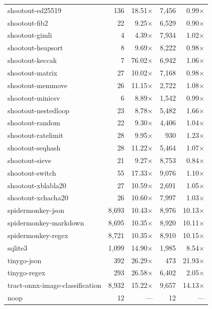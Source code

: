 \begin{longtable}{l r r r r}
shootout-ed25519 & 136 & 18.51$\times$ & 7{,}456 & 0.99$\times$ \\
shootout-fib2 & 22 & 9.25$\times$ & 6{,}529 & 0.90$\times$ \\
shootout-gimli & 4 & 4.39$\times$ & 7{,}934 & 1.02$\times$ \\
shootout-heapsort & 8 & 9.69$\times$ & 8{,}222 & 0.98$\times$ \\
shootout-keccak & 7 & 76.02$\times$ & 6{,}942 & 1.06$\times$ \\
shootout-matrix & 27 & 10.02$\times$ & 7{,}168 & 0.98$\times$ \\
shootout-memmove & 26 & 11.15$\times$ & 2{,}722 & 1.08$\times$ \\
shootout-minicsv & 6 & 8.89$\times$ & 1{,}542 & 0.99$\times$ \\
shootout-nestedloop & 23 & 8.78$\times$ & 5{,}482 & 1.66$\times$ \\
shootout-random & 22 & 9.30$\times$ & 4{,}406 & 1.04$\times$ \\
shootout-ratelimit & 28 & 9.95$\times$ & 930 & 1.23$\times$ \\
shootout-seqhash & 28 & 11.22$\times$ & 5{,}464 & 1.07$\times$ \\
shootout-sieve & 21 & 9.27$\times$ & 8{,}753 & 0.84$\times$ \\
shootout-switch & 55 & 17.33$\times$ & 9{,}076 & 1.10$\times$ \\
shootout-xblabla20 & 27 & 10.59$\times$ & 2{,}691 & 1.05$\times$ \\
shootout-xchacha20 & 26 & 10.60$\times$ & 7{,}997 & 1.03$\times$ \\
spidermonkey-json & 8{,}693 & 10.43$\times$ & 8{,}976 & 10.13$\times$ \\
spidermonkey-markdown & 8{,}695 & 10.35$\times$ & 8{,}920 & 10.11$\times$ \\
spidermonkey-regex & 8{,}721 & 10.35$\times$ & 8{,}910 & 10.15$\times$ \\
sqlite3 & 1{,}099 & 14.90$\times$ & 1{,}985 & 8.54$\times$ \\
tinygo-json & 392 & 26.29$\times$ & 473 & 21.93$\times$ \\
tinygo-regex & 293 & 26.58$\times$ & 6{,}402 & 2.05$\times$ \\
tract-onnx-image-classification & 8{,}932 & 15.22$\times$ & 9{,}657 & 14.13$\times$ \\
noop & 12 & --- & 12 & --- \\
\end{longtable}
